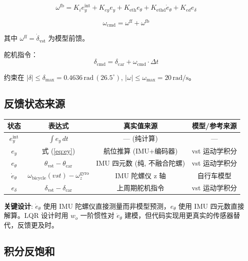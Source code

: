 \documentclass[11pt,a4paper]{article}
\begin{document}
\begin{equation}
\boxed{
\omega^{\text{fb}} = K_i e_y^{\text{int}} + K_{ey} e_y + K_{\text{eth}} e_\theta + K_{\text{ethd}} \dot{e}_\theta + K_{ed} e_\delta
}
\label{eq:omega_fb}
\end{equation}

\begin{equation}
\omega_{\text{cmd}} = \omega^{\text{ff}} + \omega^{\text{fb}}
\label{eq:omega_cmd}
\end{equation}

其中 $\omega^{\text{ff}} = \dot{\delta}_{\text{vst}}$ 为模型前馈。

舵机指令：
\begin{equation}
\delta_{\text{cmd}} = \delta_{\text{car}} + \omega_{\text{cmd}} \cdot \Delta t
\end{equation}

约束在 $|\delta| \leq \delta_{\max} = 0.4636\,\text{rad}\,(26.5^\circ)$, $|\omega| \leq \omega_{\max} = 20\,\text{rad/s}$。

\subsection{反馈状态来源}

\begin{center}
\begin{tabular}{c|c|c|c}
\toprule
状态 & 表达式 & 真实值来源 & 模型/参考来源 \\
\midrule
$e_y^{\text{int}}$ & $\int e_y \,dt$ & --- (纯计算) & --- \\
$e_y$ & 式 (\ref{eq:ey}) & 航位推算 (IMU+编码器) & vst 运动学积分 \\
$e_\theta$ & $\theta_{\text{vst}} - \theta_{\text{car}}$ & IMU 四元数 (纯, 不融合陀螺) & vst 运动学积分 \\
$\dot{e}_\theta$ & $\omega_{\text{bicycle}}(vst) - \omega_z^{\text{gyro}}$ & IMU 陀螺仪 z 轴 & 自行车模型 \\
$e_\delta$ & $\delta_{\text{vst}} - \delta_{\text{car}}$ & 上周期舵机指令 & vst 运动学积分 \\
\bottomrule
\end{tabular}
\end{center}

\textbf{关键设计}: $\dot{e}_\theta$ 使用 IMU 陀螺仪直接测量而非模型预测，$e_\theta$ 使用 IMU 四元数直接解算。LQR 设计时用 $w_o$ 一阶惯性对 $\dot{e}_\theta$ 建模，但代码实现用更真实的传感器替代，反馈更及时。

\subsection{积分反饱和}
\end{document}
